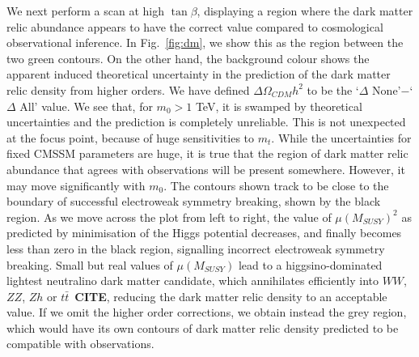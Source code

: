 \documentclass[final,3p,times,pdflatex]{elsarticle}
\begin{document}
We next perform a scan at high $\tan \beta$, displaying a region where the
dark matter relic abundance appears to have the correct value compared to
cosmological observational inference. 
In Fig.~\ref{fig:dm}, we show this as the region between the two green
contours. On the other hand, the background colour shows the apparent induced 
theoretical uncertainty in the prediction of the dark matter relic density
from higher orders. We have defined
$\Delta \Omega_{CDM} h^2$ to be the `$\Delta$ None'$-$`$\Delta$ All' value. 
We see that, for $m_0>1$ TeV, it is swamped by theoretical uncertainties and
the prediction is completely unreliable. This is not unexpected at the focus
point, because of huge sensitivities to $m_t$. While the uncertainties for
fixed CMSSM parameters are huge, it is true that the region of dark
matter relic abundance that agrees with observations will be present
somewhere. However, it may move significantly with $m_0$. The contours shown
track to be close to the boundary of successful electroweak symmetry breaking,
shown by the black region. As we move across the plot from
left to right, the value of $\mu(M_{SUSY})^2$ as predicted by minimisation of
the Higgs potential decreases, and finally becomes less than zero in the black
region, signalling incorrect electroweak symmetry breaking. Small but real
values of $\mu(M_{SUSY})$ lead to a higgsino-dominated lightest neutralino dark
matter candidate, which annihilates efficiently into $WW$, $ZZ$, $Zh$ or $t
\bar t$~{\bf CITE}, reducing the dark matter relic density to an acceptable
value. 
If we omit the
higher order corrections, we obtain instead the grey region, which would have
its own contours of dark matter relic density predicted to be compatible with
observations. 
\end{document}
